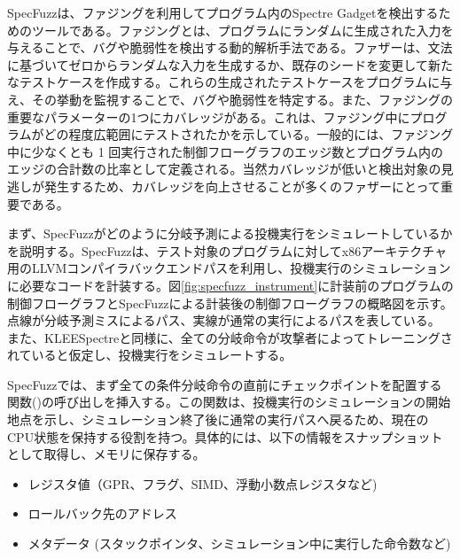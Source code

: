 SpecFuzz\cite{oleksenko2020specfuzz}は、ファジングを利用してプログラム内のSpectre Gadgetを検出するためのツールである。ファジングとは、プログラムにランダムに生成された入力を与えることで、バグや脆弱性を検出する動的解析手法である。ファザーは、文法に基づいてゼロからランダムな入力を生成するか、既存のシードを変更して新たなテストケースを作成する。これらの生成されたテストケースをプログラムに与え、その挙動を監視することで、バグや脆弱性を特定する。また、ファジングの重要なパラメーターの1つにカバレッジがある。これは、ファジング中にプログラムがどの程度広範囲にテストされたかを示している。一般的には、ファジング中に少なくとも 1 回実行された制御フローグラフのエッジ数とプログラム内のエッジの合計数の比率として定義される。当然カバレッジが低いと検出対象の見逃しが発生するため、カバレッジを向上させることが多くのファザーにとって重要である。\par
まず、SpecFuzzがどのように分岐予測による投機実行をシミュレートしているかを説明する。SpecFuzzは、テスト対象のプログラムに対してx86アーキテクチャ用のLLVMコンパイラバックエンドパスを利用し、投機実行のシミュレーションに必要なコードを計装する。図\ref{fig:specfuzz_instrument}に計装前のプログラムの制御フローグラフとSpecFuzzによる計装後の制御フローグラフの概略図を示す。点線が分岐予測ミスによるパス、実線が通常の実行によるパスを表している。
また、KLEESpectreと同様に、全ての分岐命令が攻撃者によってトレーニングされていると仮定し、投機実行をシミュレートする。\par
SpecFuzzでは、まず全ての条件分岐命令の直前にチェックポイントを配置する関数()の呼び出しを挿入する。この関数は、投機実行のシミュレーションの開始地点を示し、シミュレーション終了後に通常の実行パスへ戻るため、現在のCPU状態を保持する役割を持つ。具体的には、以下の情報をスナップショットとして取得し、メモリに保存する。\par

\begin{itemize}
  \item レジスタ値（GPR、フラグ、SIMD、浮動小数点レジスタなど)
  \item ロールバック先のアドレス
  \item メタデータ (スタックポインタ、シミュレーション中に実行した命令数など)
\end{itemize}

